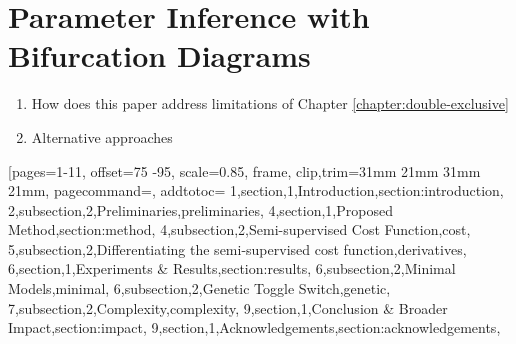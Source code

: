 \chapter{Parameter Inference with Bifurcation Diagrams}
\label{chapter:inference}
\begin{enumerate}
    \item How does this paper address limitations of Chapter \ref{chapter:double-exclusive} 
    \item Alternative approaches
\end{enumerate}

[pages=1-11, offset=75 -95, scale=0.85, frame,
        clip,trim=31mm 21mm 31mm 21mm,
        pagecommand={}, addtotoc={
        1,section,1,Introduction,section:introduction,
        2,subsection,2,Preliminaries,preliminaries,
        4,section,1,Proposed Method,section:method,
        4,subsection,2,Semi-supervised Cost Function,cost,
        5,subsection,2,Differentiating the semi-supervised cost function,derivatives,
        6,section,1,Experiments \& Results,section:results,
        6,subsection,2,Minimal Models,minimal,
        6,subsection,2,Genetic Toggle Switch,genetic,
        7,subsection,2,Complexity,complexity,
        9,section,1,Conclusion \& Broader Impact,section:impact,
        9,section,1,Acknowledgements,section:acknowledgements},
